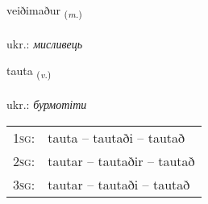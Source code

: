 \documentclass[frontgrid, backgrid]{flacards}\usepackage[]{graphicx}\usepackage[]{xcolor}
\begin{document}
\renewcommand{\flhead}{\vskip5pt \fboxsep=0pt {\small\bfseries\footnotesize Nafnorð | іменник}}
\renewcommand{\fcfoot}{\vskip5pt \fboxsep=0pt \hspace{2pt}{\small\bfseries\footnotesize 3K}}

\renewcommand{\blhead}{\vskip5pt {\small\bfseries\footnotesize Nafnorð | іменник }}
\renewcommand{\bcfoot}{\vskip5pt \hspace{2pt}{\small\bfseries\footnotesize 3K}}


{veiðimaður \small{\textsubscript{(\textit{m.})}} \\[1ex] %
\textphonetic{[veiːðɪmaðʏr]} \\
ukr.: \emph{мисливець} \\  [2ex]
\renewcommand*{\arraystretch}{0.8}
}

\renewcommand{\flhead}{\vskip5pt \fboxsep=0pt {\small\bfseries\footnotesize Sagnorð | дієслово}}
\renewcommand{\fcfoot}{\vskip5pt \fboxsep=0pt \hspace{2pt}{\small\bfseries\footnotesize 3K}}

\renewcommand{\blhead}{\vskip5pt {\small\bfseries\footnotesize Sagnorð | дієслово }}
\renewcommand{\bcfoot}{\vskip5pt \hspace{2pt}{\small\bfseries\footnotesize 3K}}


{tauta \small{\textsubscript{(\textit{v.})}} \\[1ex] %
\textphonetic{[tʰœiːta]} \\
ukr.: \emph{бурмотіти} \\  [2ex]
\renewcommand*{\arraystretch}{0.8}
\begin{tabular}{p{1cm}l}
\textsc{1sg}: & tauta -- tautaði -- tautað \\ 
\textsc{2sg}: & tautar -- tautaðir -- tautað \\ 
\textsc{3sg}: & tautar -- tautaði -- tautað \\ 
\end{tabular}
}
\end{document}
